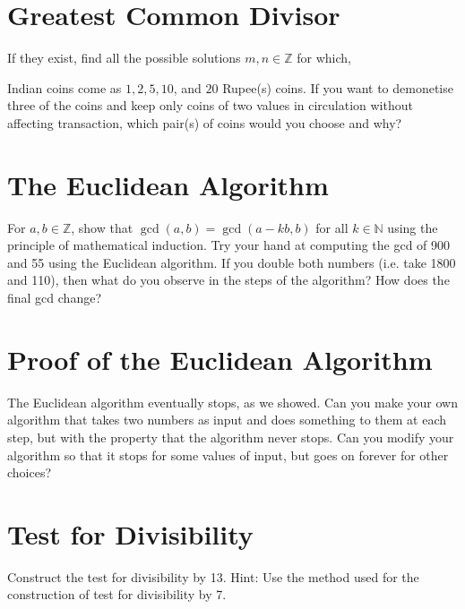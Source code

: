 \documentclass[12pt]{exam}
\begin{document}
\section{Greatest Common Divisor}
\begin{questions}
\question If they exist, find all the possible solutions $m, n \in \mathbb{Z}$ for which,
\question Indian coins come as $1, 2, 5, 10$, and $20$ Rupee(s) coins. If you want to demonetise three of the coins and keep only coins of two values in circulation without affecting transaction, which pair(s) of coins would you choose and why? 
\end{questions}

\section{The Euclidean Algorithm}
\begin{questions}
    \question For $a, b \in \mathbb{Z}$, show that $\gcd(a, b) = \gcd(a - kb, b)$ for all $k \in \mathbb{N}$ using the principle of mathematical induction.
    \question Try your hand at computing the gcd of 900 and 55 using the Euclidean algorithm.
    \question If you double both numbers (i.e. take 1800 and 110), then what do you observe in the steps of the algorithm? How does the final gcd change?
\end{questions}
\section{Proof of the Euclidean Algorithm}
\begin{questions}
    \question The Euclidean algorithm eventually stops, as we showed. Can you make your own algorithm that takes two numbers as input and does something to them at each step, but with the property that the algorithm never stops.
    \question Can you modify your algorithm so that it stops for some values of input, but goes on forever for other choices?
\end{questions}

\section{Test for Divisibility}
\begin{questions}
        \question Construct the test for divisibility by 13. Hint: Use the method used for the construction of test for divisibility by 7.
\end{questions}
\end{document}
